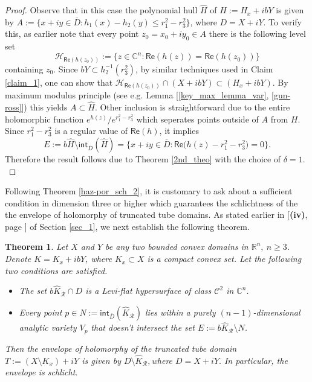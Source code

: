\documentclass[12pt,reqno, a4paper]{amsart}
\newtheorem{theorem}{Theorem}[section]
\theoremstyle{definition}
\theoremstyle{definition}
\numberwithin{equation}{section}
\def\R{\mathbb{R}}                              %
\def\C{\mathbb{C}}                              %
\begin{document}
\begin{proof}
Observe that in this case the polynomial hull $\widehat{H}$ of $H:=H_{x}+ibY$ is given by $A:=\{x+iy\in \overline{D}: h_1(x)-h_2(y)\leq r_1^2-r_3^2\}$, where $D=X+iY$. To verify this, as earlier note that every point $z_0=x_0+iy_0 \in A$ there is the following level set $$\mathcal{H}_{\textsf{Re}(h(z_0))}:=\{z\in \C^n: \textsf{Re}(h(z))=\textsf{Re}(h(z_0))\}$$ containing $z_0$.  
Since $bY\subset h_2^{-1}(r_3^2)$, by similar techniques used in Claim \ref{claim_1}, one can show that $\mathcal{H}_{\textsf{Re}(h(z_0))} \cap (X+ibY)\subset (H_{x}+ibY).$ By maximum modulus principle (see e.g. Lemma [\ref{key_max_lemma_var}, \ref{gun-ross}]) this yields ${A\subset \widehat{H}}.$ Other inclusion is straightforward due to the entire holomorphic function ${e^{h(z)}}/{e^{r_1^2-r_3^2}}$ which seperates points outside of $A$ from $H$. Since $r_1^2-r_3^2$ is a regular value of $\textsf{Re}(h)$, it implies 
$$E:=b\widehat{H}\setminus\textsf{int}_{\overline{D}}(\widehat{H}) =\{x+iy\in \overline{D}: \textsf{Re}\big(h(z)-r_1^2-r_3^2\big)=0\}.$$ Therefore the result follows due to Theorem \ref{2nd_theo} with the choice of $\delta=1.$
\end{proof}

Following Theorem \ref{haz-por_sch_2}, it is customary to ask about a sufficient condition in dimension three or higher which guarantees the schlichtness of the the envelope of holomorphy of truncated tube domains. As stated earlier in [\textbf{(iv)}, page \pageref{part:iv}] of Section \ref{sec_1}, we next establish the following theorem.

\begin{theorem}\label{3rd_theo}
Let $X$ and $Y$ be any two bounded convex domains in $\R^n, ~{n\geq 3}$.
Denote $K=K_x+ibY$, where $K_x\subset X$ is a compact convex set. Let the following two conditions are satisfied.
	
\begin{itemize}
	\item [(i)] The set $b\widehat{K}_{\mathcal{R}}\cap D$ is a Levi-flat hypersurface of class $\mathcal{C}^2$ in $\C^n$.
	
	\item [(ii)] Every point $p\in N:=\textsf{int}_{\overline{D}}(\widehat{K}_{\mathcal{R}})$  
	lies within a purely $(n-1)$-dimensional analytic variety $V_p$ that doesn't intersect the set ${E:=b\widehat{K}_{\mathcal{R}}\setminus N}$.
\end{itemize}	
Then the envelope of holomorphy of the truncated tube domain $T:=(X\setminus K_x)+iY$ is given by $D\setminus\widehat{K}_{\mathcal{R}},$where $D=X+iY.$ In particular, the envelope is schlicht.
\end{theorem}
\end{document}
